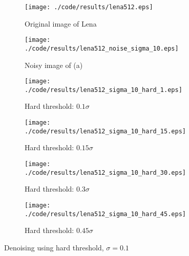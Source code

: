 \documentclass[journal,comsoc]{IEEEtran}
\begin{document}
\begin{figure}[!hbt]
  \centering
  \begin{subfigure}{.25\textwidth}
    \centering
    \texttt{[image: ./code/results/lena512.eps]}
    \caption{Original image of Lena}
    \label{subfig:original-image-of-lena}
  \end{subfigure}%
  \begin{subfigure}{.25\textwidth}
    \centering
    \texttt{[image: ./code/results/lena512\_noise\_sigma\_10.eps]}
    \caption{Noisy image of (a)}
    \label{subfig:sigma-10-noisy-image-of-a}
  \end{subfigure}

  \begin{subfigure}{0.25\textwidth}
    \centering{}
    \texttt{[image: ./code/results/lena512\_sigma\_10\_hard\_1.eps]}
    \caption{Hard threshold: $0.1\sigma$}
  \end{subfigure}%
  \begin{subfigure}{.25\textwidth}
    \centering{}
    \texttt{[image: ./code/results/lena512\_sigma\_10\_hard\_15.eps]}
    \caption{Hard threshold: $0.15\sigma$}
  \end{subfigure}

  \begin{subfigure}{0.25\textwidth}
    \centering{}
    \texttt{[image: ./code/results/lena512\_sigma\_10\_hard\_30.eps]}
    \caption{Hard threshold: $0.3\sigma$}
  \end{subfigure}%
  \begin{subfigure}{.25\textwidth}
    \centering{}
    \texttt{[image: ./code/results/lena512\_sigma\_10\_hard\_45.eps]}
    \caption{Hard threshold: $0.45\sigma$}
  \end{subfigure}
  
  \caption{Denoising using hard threshold, $\sigma=0.1$}
  \label{fig:sigma-10-hard-threshold}
\end{figure}
\end{document}
